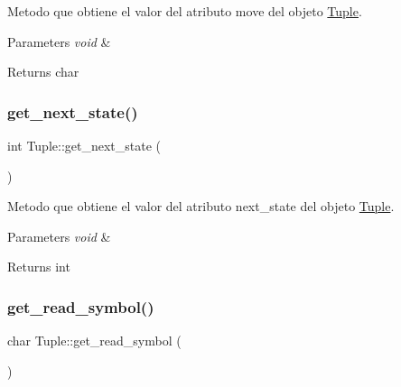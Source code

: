Metodo que obtiene el valor del atributo \textquotesingle{}move\textquotesingle{} del objeto \hyperlink{class_tuple}{Tuple}. 


\begin{DoxyParams}{Parameters}
{\em void} & \\
\hline
\end{DoxyParams}
\begin{DoxyReturn}{Returns}
char 
\end{DoxyReturn}
\hypertarget{class_tuple_a7f76456c7be5611575598eca238bf0f2}{}\label{class_tuple_a7f76456c7be5611575598eca238bf0f2} 
\subsubsection{\texorpdfstring{get\+\_\+next\+\_\+state()}{get\_next\_state()}}
{\footnotesize\ttfamily int Tuple\+::get\+\_\+next\+\_\+state (\begin{DoxyParamCaption}\item[{void}]{ }\end{DoxyParamCaption})}



Metodo que obtiene el valor del atributo \textquotesingle{}next\+\_\+state\textquotesingle{} del objeto \hyperlink{class_tuple}{Tuple}. 


\begin{DoxyParams}{Parameters}
{\em void} & \\
\hline
\end{DoxyParams}
\begin{DoxyReturn}{Returns}
int 
\end{DoxyReturn}
\hypertarget{class_tuple_a979cd76761b06c43531d3a7c8d7e34e8}{}\label{class_tuple_a979cd76761b06c43531d3a7c8d7e34e8} 
\subsubsection{\texorpdfstring{get\+\_\+read\+\_\+symbol()}{get\_read\_symbol()}}
{\footnotesize\ttfamily char Tuple\+::get\+\_\+read\+\_\+symbol (\begin{DoxyParamCaption}\item[{void}]{ }\end{DoxyParamCaption})}



